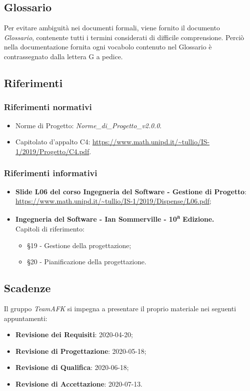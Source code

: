\subsection{Glossario}
Per evitare ambiguità nei documenti formali, viene fornito il documento \textit{Glossario}, contenente tutti i termini considerati di difficile comprensione. Perciò nella documentazione fornita ogni vocabolo contenuto nel Glossario è contrassegnato dalla lettera G a pedice.

\subsection{Riferimenti}
\subsubsection{Riferimenti normativi}
\begin{itemize}
	\item Norme di Progetto: \textit{Norme\_di\_Progetto\_v2.0.0}.
	\item Capitolato d'appalto C4: \url{https://www.math.unipd.it/~tullio/IS-1/2019/Progetto/C4.pdf}.
\end{itemize}
\subsubsection{Riferimenti informativi}
\begin{itemize}
	\item \textbf{Slide L06 del corso Ingegneria del Software - Gestione di Progetto}: \\
	\url{https://www.math.unipd.it/~tullio/IS-1/2019/Dispense/L06.pdf};
	\item \textbf{Ingegneria del Software - Ian Sommerville - 10\textsuperscript{a} Edizione.}\\
	Capitoli di riferimento: \begin{itemize}
	\item \S 19 - Gestione della progettazione;
	\item \S 20 - Pianificazione della progettazione.
	\end{itemize}
\end{itemize}
\subsection{Scadenze}
Il gruppo \textit{TeamAFK} si impegna a presentare il proprio materiale nei seguenti appuntamenti:\\
\begin{itemize}
\item \textbf{Revisione dei Requisiti}: 2020-04-20;
\item \textbf{Revisione di Progettazione}: 2020-05-18;
\item \textbf{Revisione di Qualifica}: 2020-06-18;
\item \textbf{Revisione di Accettazione}: 2020-07-13. 
\end{itemize}

